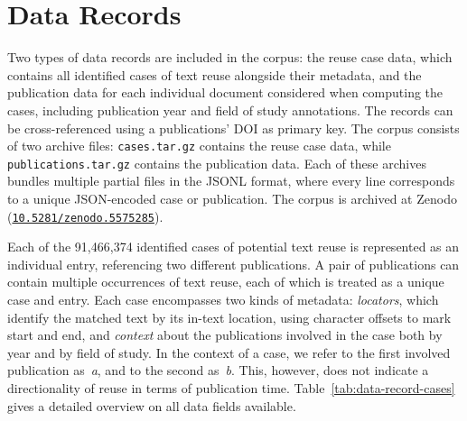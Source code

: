 \section*{Data Records}



Two types of data records are included in the \webisReuseCorpus corpus: the reuse case data, which contains all identified cases of text reuse alongside their metadata, and the publication data for each individual document considered when computing the cases, including publication year and field of study annotations. The records can be cross-referenced using a publications' DOI as primary key. The corpus consists of two archive files: \texttt{cases.tar.gz} contains the reuse case data, while \texttt{publications.tar.gz} contains the publication data. Each of these archives bundles multiple partial files in the JSONL format, where every line corresponds to a unique JSON-encoded case or publication. The \webisReuseCorpus corpus is archived at Zenodo (\href{http://dx.doi.org/10.5281/zenodo.5575285}{\texttt{10.5281/zenodo.5575285}}\cite{zenodo-metadata}). 

Each of the 91,466,374 identified cases of potential text reuse is represented as an individual entry, referencing two different publications. A pair of publications can contain multiple occurrences of text reuse, each of which is treated as a unique case and entry. Each case encompasses two kinds of metadata:
\Ni
\textit{locators}, which identify the matched text by its in-text location, using character offsets to mark start and end, and
\Nii
\textit{context} about the publications involved in the case both by year and by field of study.
In the context of a case, we refer to the first involved publication as~\textit{a}, and to the second as~\textit{b}. This, however, does not indicate a directionality of reuse in terms of publication time. Table~\ref{tab:data-record-cases} gives a detailed overview on all data fields available.

